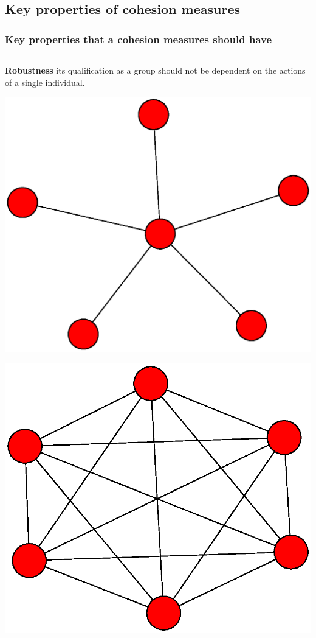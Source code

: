\documentclass[ignorenonframetext,red,8pt,notes=hide]{beamer}
\begin{document}
\subsection{Key properties of cohesion measures}

\begin{frame}[label=]
\frametitle{Key properties that a cohesion measures should have}

\begin{columns}[c]
\begin{column}{0.3\textwidth}
\textbf{Robustness} its qualification as a group should not be dependent on the actions of a single individual.

\begin{center}
\includegraphics[scale=0.1]{img/star}
\end{center}

\begin{center}
\includegraphics[scale=0.1]{img/complete}
\end{center}
\end{column}


\end{columns}
\end{frame}
\end{document}
